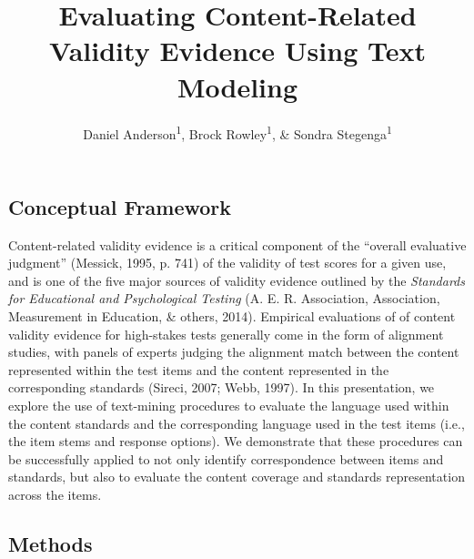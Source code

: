 \documentclass[doc]{apa6}
\title{Evaluating Content-Related Validity Evidence Using Text Modeling}
\author{Daniel Anderson\textsuperscript{1}, Brock Rowley\textsuperscript{1}, \& Sondra Stegenga\textsuperscript{1}}
\affiliation{
    \vspace{0.5cm}
          \textsuperscript{1} University of Oregon  }
\theoremstyle{definition}
\theoremstyle{definition}
\theoremstyle{definition}
\theoremstyle{remark}
\begin{document}
\maketitle

\setcounter{secnumdepth}{0}



\subsection{Conceptual Framework}\label{conceptual-framework}

Content-related validity evidence is a critical component of the
\enquote{overall evaluative judgment} (Messick, 1995, p. 741) of the
validity of test scores for a given use, and is one of the five major
sources of validity evidence outlined by the \emph{Standards for
Educational and Psychological Testing} (A. E. R. Association,
Association, Measurement in Education, \& others, 2014). Empirical
evaluations of of content validity evidence for high-stakes tests
generally come in the form of alignment studies, with panels of experts
judging the alignment match between the content represented within the
test items and the content represented in the corresponding standards
(Sireci, 2007; Webb, 1997). In this presentation, we explore the use of
text-mining procedures to evaluate the language used within the content
standards and the corresponding language used in the test items (i.e.,
the item stems and response options). We demonstrate that these
procedures can be successfully applied to not only identify
correspondence between items and standards, but also to evaluate the
content coverage and standards representation across the items.

\subsection{Methods}\label{methods}
\end{document}
